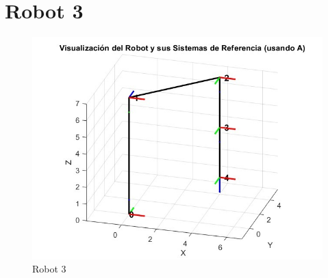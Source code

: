 \section{Robot 3}

\begin{figure}
	\centering
	\includegraphics[width=0.5\linewidth]{img/ROBOT3}
	\caption{Robot 3}
	\label{fig:robot3}
\end{figure}
